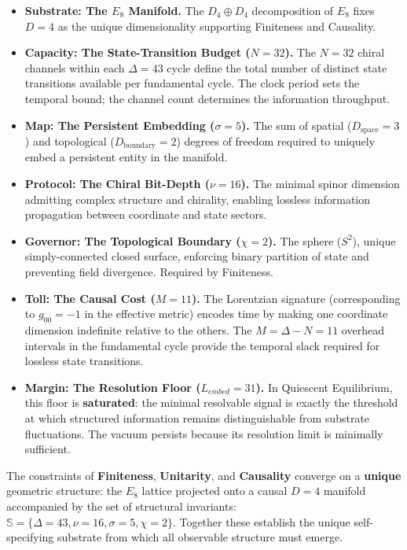 \begin{itemize}
    \item[] \textbf{Substrate: The $E_8$ Manifold.} The $D_4 \oplus D_4$ decomposition of $E_8$ fixes $D=4$ as the unique dimensionality supporting Finiteness and Causality.

    \item \textbf{Capacity: The State-Transition Budget ($N=32$).} The $N=32$ chiral channels within each $\Delta=43$ cycle define the total number of distinct state transitions available per fundamental cycle. The clock period sets the temporal bound; the channel count determines the information throughput.
    
    \item \textbf{Map: The Persistent Embedding ($\sigma=5$).} The sum of spatial ($D_{\text{space}}=3$) and topological ($D_{\text{boundary}}=2$) degrees of freedom required to uniquely embed a persistent entity in the manifold.
    
    \item \textbf{Protocol: The Chiral Bit-Depth ($\nu=16$).} The minimal spinor dimension admitting complex structure and chirality, enabling lossless information propagation between coordinate and state sectors.

    \item \textbf{Governor: The Topological Boundary ($\chi=2$).} The sphere ($S^2$), unique simply-connected closed surface, enforcing binary partition of state and preventing field divergence. Required by Finiteness.

    \item \textbf{Toll: The Causal Cost ($M=11$).} The Lorentzian signature (corresponding to $g_{00}=-1$ in the effective metric) encodes time by making one coordinate dimension indefinite relative to the others. The $M = \Delta - N = 11$ overhead intervals in the fundamental cycle provide the temporal slack required for lossless state transitions.

    \item \textbf{Margin: The Resolution Floor ($L_{embed}=31$).} In Quiescent Equilibrium, this floor is \textbf{saturated}: the minimal resolvable signal is exactly the threshold at which structured information remains distinguishable from substrate fluctuations. The vacuum persists because its resolution limit is minimally sufficient.
\end{itemize}

The constraints of \textbf{Finiteness}, \textbf{Unitarity}, and \textbf{Causality} converge on a \textbf{unique} geometric structure: the $E_8$ lattice projected onto a causal $D=4$ manifold accompanied by the set of structural invariants: $\mathbb{S} = \{\Delta{=}43, \nu{=}16, \sigma{=}5, \chi{=}2\}$. Together these establish the unique self-specifying substrate from which all observable structure must emerge.